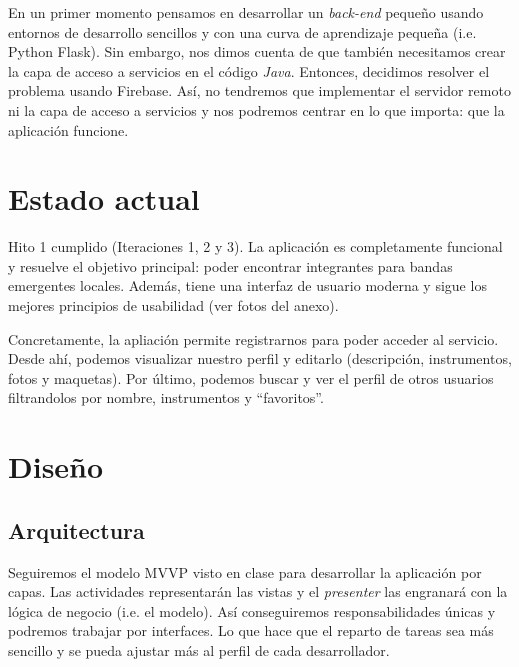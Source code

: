 \documentclass[a4paper,12pt]{article}
\begin{document}
En un primer momento pensamos en desarrollar un \textit{back-end} pequeño usando entornos de desarrollo sencillos y con una curva de aprendizaje pequeña (i.e. Python Flask). Sin embargo, nos dimos cuenta de que también necesitamos crear la capa de acceso a servicios en el código \textit{Java}. Entonces, decidimos resolver el problema usando Firebase. Así, no tendremos que implementar el servidor remoto ni la capa de acceso a servicios y nos podremos centrar en lo que importa: que la aplicación funcione.
\section{Estado actual}
Hito 1 cumplido (Iteraciones 1, 2 y 3). La aplicación es completamente funcional y resuelve el objetivo principal: poder encontrar integrantes para bandas emergentes locales. Además, tiene una interfaz de usuario moderna y sigue los mejores principios de usabilidad (ver fotos del anexo).

Concretamente, la apliación permite registrarnos para poder acceder al servicio. Desde ahí, podemos visualizar nuestro perfil y editarlo (descripción, instrumentos, fotos y maquetas). Por último, podemos buscar y ver el perfil de otros usuarios filtrandolos por nombre, instrumentos y ``favoritos''.
\section{Diseño}
\subsection{Arquitectura}
Seguiremos el modelo MVVP visto en clase para desarrollar la aplicación por capas. Las actividades representarán las vistas y el \textit{presenter} las engranará con la lógica de negocio (i.e. el modelo). Así conseguiremos responsabilidades únicas y podremos trabajar por interfaces. Lo que hace que el reparto de tareas sea más sencillo y se pueda ajustar más al perfil de cada desarrollador.
\end{document}
